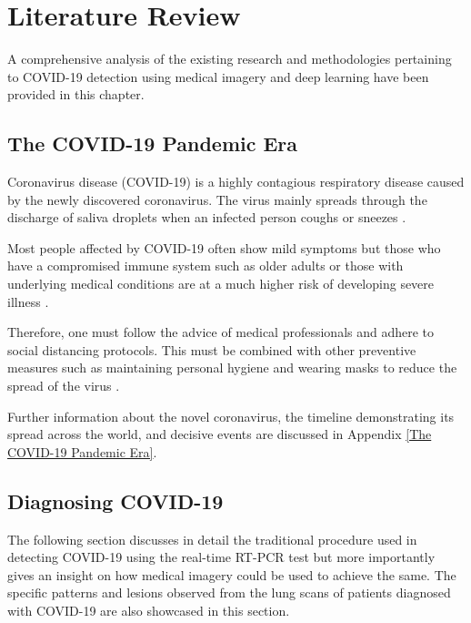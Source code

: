 
\chapter{Literature Review} %

\label{LR} %


A comprehensive analysis of the existing research and methodologies 
pertaining to COVID-19 detection using 
medical imagery and deep learning have been provided in this chapter.


\section{The COVID-19 Pandemic Era}

Coronavirus disease (COVID-19) is a highly contagious respiratory disease caused by the newly discovered coronavirus. 
The virus mainly spreads through the discharge of saliva droplets when an infected person coughs or sneezes \cite{WHO2020}.

Most people affected by COVID-19 often show mild symptoms but those who have a compromised immune system such as older adults or those with underlying medical conditions are at a much higher risk of developing severe illness \cite{CDC2020}.

Therefore, one must follow the advice of medical professionals and adhere to social distancing protocols. This must be combined with other preventive measures such as maintaining personal hygiene and wearing masks to reduce the spread of the virus \cite{CDCa2020}.

Further information about the novel coronavirus, the timeline demonstrating its spread across the world, and decisive events are discussed in Appendix \ref{The COVID-19 Pandemic Era}.

\section{Diagnosing COVID-19}
The following section discusses in detail the traditional procedure used 
in detecting COVID-19 using the real-time RT-PCR test but more importantly gives an insight on 
how medical imagery could be used to achieve the same. The specific patterns 
and lesions observed from the lung scans of patients diagnosed with COVID-19 are also showcased in this section.

